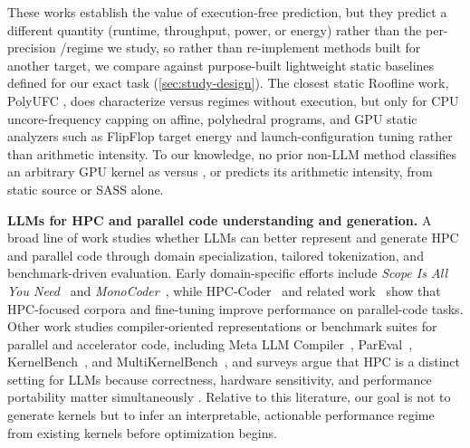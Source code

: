 These works establish the value of execution-free prediction, but they predict a different quantity (runtime, throughput, power, or energy) rather than the per-precision \bandwidthbound/\computebound regime we study, so rather than re-implement methods built for another target, we compare against purpose-built lightweight static baselines defined for our exact task (\autoref{sec:study-design}).
The closest static Roofline work, PolyUFC \cite{shahPolyUFCPolyhedralCompilation2026}, does characterize \computebound versus \bandwidthbound regimes without execution, but only for CPU uncore-frequency capping on affine, polyhedral programs, and GPU static analyzers such as FlipFlop \cite{rajputFlipFlopStaticAnalysis2026} target energy and launch-configuration tuning rather than arithmetic intensity.
To our knowledge, no prior non-LLM method classifies an arbitrary GPU kernel as \bandwidthbound versus \computebound, or predicts its arithmetic intensity, from static source or SASS alone.






\noindent\textbf{LLMs for HPC and parallel code understanding and generation.}
A broad line of work studies whether LLMs can better represent and generate HPC and parallel code through domain specialization, tailored tokenization, and benchmark-driven evaluation.
Early domain-specific efforts include \textit{Scope Is All You Need}~\cite{talkadoshScopeAllYou2023} and \textit{MonoCoder}~\cite{talkadoshMonoCoderDomainSpecificCode2023}, while HPC-Coder~\cite{nicholsHPCCoderModelingParallel2024a} and related work~\cite{danielnicholsModelingParallelPrograms2023} show that HPC-focused corpora and fine-tuning improve performance on parallel-code tasks.
Other work studies compiler-oriented representations or benchmark suites for parallel and accelerator code, including Meta LLM Compiler~\cite{cumminsMetaLargeLanguage2024a}, ParEval~\cite{nicholsCanLargeLanguage2024}, KernelBench~\cite{ouyangKernelBenchCanLLMs2025}, and MultiKernelBench~\cite{wenMultiKernelBenchMultiPlatformBenchmark2025}, and surveys argue that HPC is a distinct setting for LLMs because correctness, hardware sensitivity, and performance portability matter simultaneously \cite{chenLandscapeChallengesHPC2024,gongLanguageModelsCode2025}.
Relative to this literature, our goal is not to generate kernels but to infer an interpretable, actionable performance regime from existing kernels before optimization begins.






